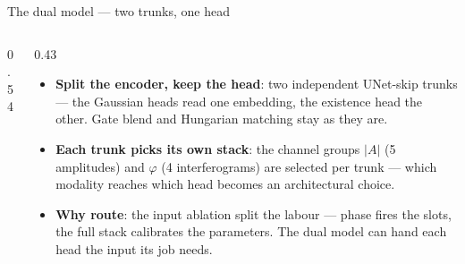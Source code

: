 \documentclass[aspectratio=169,9pt]{beamer}
\begin{document}
\begin{frame}{The dual model --- two trunks, one head}
\begin{columns}[c]
\begin{column}{0.54\textwidth}
    \end{column}
    \begin{column}{0.43\textwidth}
      \small
      \begin{itemize}\setlength{\itemsep}{5pt}
        \item \textbf{Split the encoder, keep the head}: two independent UNet-skip
              trunks --- the Gaussian heads read one embedding, the existence
              head the other. Gate blend and Hungarian matching stay as they are.
        \item \textbf{Each trunk picks its own stack}: the channel groups $|A|$
              (5 amplitudes) and $\varphi$ (4 interferograms) are selected
              per trunk --- which modality reaches which head becomes an
              architectural choice.
        \item \textbf{Why route}: the input ablation split the labour --- phase
              fires the slots, the full stack calibrates the parameters. The
              dual model can hand each head the input its job needs.
      \end{itemize}
    \end{column}
  \end{columns}
\end{frame}
\end{document}
